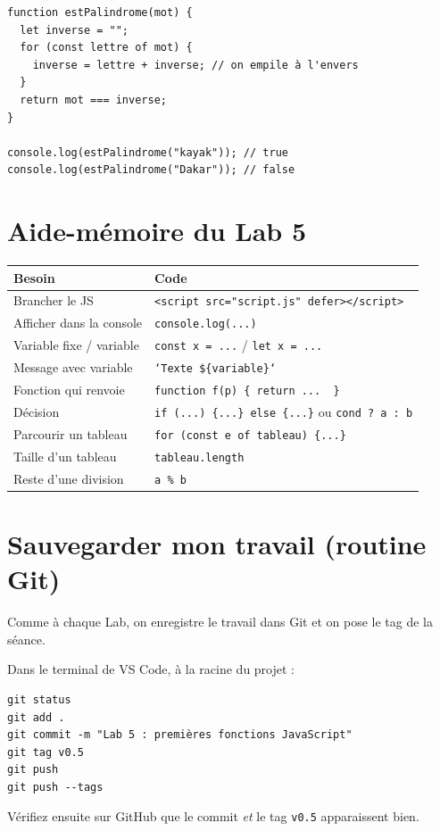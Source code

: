 \documentclass[11pt,a4paper]{article}
\newcommand{\code}[1]{\texttt{#1}}
\begin{document}
\begin{lstlisting}[style=js]
function estPalindrome(mot) {
  let inverse = "";
  for (const lettre of mot) {
    inverse = lettre + inverse; // on empile à l'envers
  }
  return mot === inverse;
}

console.log(estPalindrome("kayak")); // true
console.log(estPalindrome("Dakar")); // false
\end{lstlisting}

\section{Aide-mémoire du Lab 5}

\begin{center}
\begin{tabular}{p{5cm} p{8cm}}
\toprule
\textbf{Besoin} & \textbf{Code} \\
\midrule
Brancher le JS & \code{<script src="script.js" defer></script>} \\
Afficher dans la console & \code{console.log(...)} \\
Variable fixe / variable & \code{const x = ...} \quad / \quad \code{let x = ...} \\
Message avec variable & \code{`Texte \$\{variable\}`} \\
Fonction qui renvoie & \code{function f(p) \{ return ...\, \}} \\
Décision & \code{if (...) \{...\} else \{...\}} \quad ou \quad \code{cond ? a : b} \\
Parcourir un tableau & \code{for (const e of tableau) \{...\}} \\
Taille d'un tableau & \code{tableau.length} \\
Reste d'une division & \code{a \% b} \\
\bottomrule
\end{tabular}
\end{center}

\section{Sauvegarder mon travail (routine Git)}

Comme à chaque Lab, on enregistre le travail dans Git et on pose le tag de la séance.

\begin{retenirbox}
Dans le terminal de VS Code, à la racine du projet :
\begin{lstlisting}[style=html]
git status
git add .
git commit -m "Lab 5 : premières fonctions JavaScript"
git tag v0.5
git push
git push --tags
\end{lstlisting}
Vérifiez ensuite sur GitHub que le commit \emph{et} le tag \code{v0.5} apparaissent bien.
\end{retenirbox}
\end{document}
